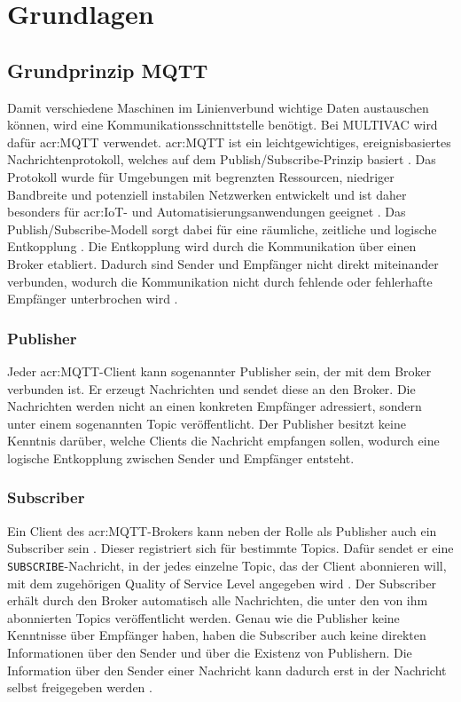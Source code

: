 \chapter{Grundlagen}
\label{cha:Grundlagen}

\section{Grundprinzip MQTT}
Damit verschiedene Maschinen im Linienverbund wichtige Daten austauschen können, wird eine Kommunikationsschnittstelle benötigt. Bei MULTIVAC wird dafür \gls{acr:MQTT} verwendet. 
    \gls{acr:MQTT} ist ein leichtgewichtiges, ereignisbasiertes Nachrichtenprotokoll, welches auf dem Publish/Subscribe-Prinzip basiert \autocite[5--6]{ottenwalderChurnDynamischenPublish}.
    Das Protokoll wurde für Umgebungen mit begrenzten Ressourcen, niedriger Bandbreite und potenziell instabilen Netzwerken entwickelt und ist daher besonders für \gls{acr:IoT}- und Automatisierungsanwendungen geeignet \autocite[11]{hivemqMQTTMQTT5}.  
    Das Publish/Subscribe-Modell sorgt dabei für eine räumliche, zeitliche und logische Entkopplung \autocite[5]{ottenwalderChurnDynamischenPublish}. Die Entkopplung wird durch die Kommunikation über einen Broker etabliert. Dadurch sind Sender und Empfänger nicht direkt miteinander verbunden, wodurch die Kommunikation nicht durch fehlende oder fehlerhafte Empfänger unterbrochen wird \autocite[9]{hivemqMQTTMQTT5}.

    \subsection{Publisher}
        Jeder \gls{acr:MQTT}-Client kann sogenannter Publisher sein, der mit dem Broker verbunden ist. Er erzeugt Nachrichten und sendet diese an den Broker.
        Die Nachrichten werden nicht an einen konkreten Empfänger adressiert, sondern unter einem sogenannten Topic veröffentlicht.
        Der Publisher besitzt keine Kenntnis darüber, welche Clients die Nachricht empfangen sollen, wodurch eine logische Entkopplung zwischen Sender und Empfänger entsteht. \autocite[15--16]{hivemqMQTTMQTT5}

    \subsection{Subscriber}
        Ein Client des \gls{acr:MQTT}-Brokers kann neben der Rolle als Publisher auch ein Subscriber sein \autocite[68]{IoTMQTT}. Dieser registriert sich für bestimmte Topics. Dafür sendet er eine \lstinline|SUBSCRIBE|-Nachricht, in der jedes einzelne Topic, das der Client abonnieren will, mit dem zugehörigen Quality of Service Level angegeben wird \autocite[16]{hivemqMQTTMQTT5}.
        Der Subscriber erhält durch den Broker automatisch alle Nachrichten, die unter den von ihm abonnierten Topics veröffentlicht werden. 
        Genau wie die Publisher keine Kenntnisse über Empfänger haben, haben die Subscriber auch keine direkten Informationen über den Sender und über die Existenz von Publishern. Die Information über den Sender einer Nachricht kann dadurch erst in der Nachricht selbst freigegeben werden \autocite[12]{hivemqMQTTMQTT5}.      

